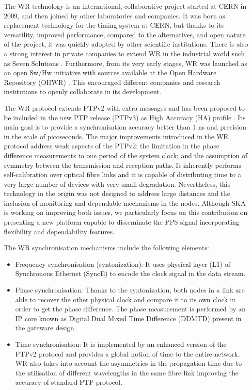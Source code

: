 The WR technology \cite{Wlostowski2011} is an international, collaborative project started at CERN in 2009, and then joined by other laboratories and companies. It was born as replacement technology for the timing system at CERN, but thanks to its versatility, improved performance, compared to the alternatives, and open nature of the project, it was quickly adopted by other scientific institutions. There is also a strong interest in private companies to extend WR in the industrial world such as Seven Solutions \cite{sevensols:wr}. Furthermore, from its very early stages, WR was launched as an open Sw/Hw initiative with sources available at the Open Hardware Repository (OHWR) \cite{ohwr:repo}. This encouraged different companies and research institutions to openly collaborate in its development.

The WR protocol extends PTPv2 with extra messages and has been proposed to be included in the new PTP release (PTPv3) as High Accuracy (HA) profile \cite{wr:maciej-ptpv3-standard}
. Its main goal is to provide a synchronisation accuracy better than 1 ns and precision in the scale of picoseconds. The major improvements introduced in the WR protocol address weak aspects of the PTPv2: the limitation in the phase difference measurements to one period of the system clock; and the assumption of symmetry between the transmission and reception paths. It inherently performs self-calibration over optical fibre links and it is capable of distributing time to a very large number of devices with very small degradation. Nevertheless, this technology in the origin was not designed to address large distances and the inclusion of monitoring and dependable mechanisms in the nodes. Although SKA is working on improving both issues, we particularly focus on this contribution on presenting a new platform capable to disseminate the PPS signal incorporating flexibility and dependability features.  

The WR synchronisation mechanisms include the following elements:

\begin{itemize}
	\item {Frequency synchronisation (syntonization): It uses physical layer (L1) of Synchronous Ethernet (SyncE) to encode the clock signal in the data stream. }
	\item {Phase synchronisation: Thanks to the syntonization, both nodes in a link are able to recover the other physical clock and compare it to its own clock in order to get the phase difference. The phase measurement is performed by an IP core known as Digital Dual Mixed Time Difference (DDMTD) present in the gateware design.}
	\item {Time synchronisation: It is implemented by an enhanced version of the PTPv2 protocol and provides a global notion of time to the entire network. WR also takes into account the asymmetries in the propagation time due to the utilisation of different wavelengths in the same fibre link improving the accuracy of standard PTP protocol.}
\end{itemize}

